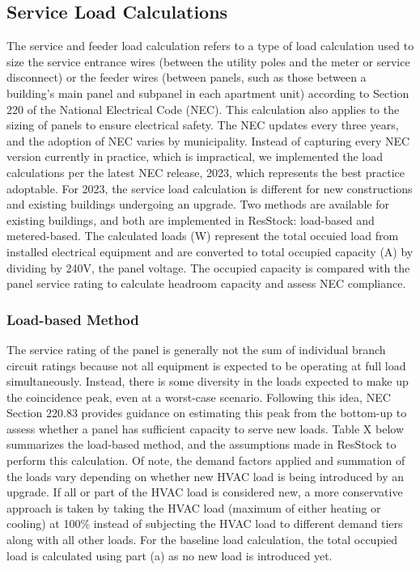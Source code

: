 
\subsection{Service Load Calculations}
The service and feeder load calculation refers to a type of load calculation used to size the service entrance wires (between the utility poles and the meter or service disconnect) or the feeder wires (between panels, such as those between a building’s main panel and subpanel in each apartment unit) according to Section 220 of the National Electrical Code (NEC). This calculation also applies to the sizing of panels to ensure electrical safety. The NEC updates every three years, and the adoption of NEC varies by municipality. Instead of capturing every NEC version currently in practice, which is impractical, we implemented the load calculations per the latest NEC release, 2023, which represents the best practice adoptable. For 2023, the service load calculation is different for new constructions and existing buildings undergoing an upgrade. Two methods are available for existing buildings, and both are implemented in ResStock: load-based and metered-based. The calculated loads (W) represent the total occuied load from installed electrical equipment and are converted to total occupied capacity (A) by dividing by 240V, the panel voltage. The occupied capacity is compared with the panel service rating to calculate headroom capacity and assess NEC compliance.

\subsubsection{Load-based Method}
The service rating of the panel is generally not the sum of individual branch circuit ratings because not all equipment is expected to be operating at full load simultaneously. Instead, there is some diversity in the loads expected to make up the coincidence peak, even at a worst-case scenario. Following this idea, NEC Section 220.83 provides guidance on estimating this peak from the bottom-up to assess whether a panel has sufficient capacity to serve new loads. Table X below summarizes the load-based method, and the assumptions made in ResStock to perform this calculation.
Of note, the demand factors applied and summation of the loads vary depending on whether new HVAC load is being introduced by an upgrade. If all or part of the HVAC load is considered new, a more conservative approach is taken by taking the HVAC load (maximum of either heating or cooling) at 100\% instead of subjecting the HVAC load to different demand tiers along with all other loads. For the baseline load calculation, the total occupied load is calculated using part (a) as no new load is introduced yet.

